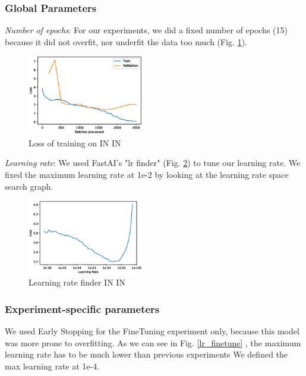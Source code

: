 \documentclass{article}
\begin{document}
\subsubsection{Global Parameters}

\textit{Number of epochs}: For our experiments, we did a fixed number of epochs
 (15) because it did not overfit, nor underfit the data too much (Fig. \ref{loss_in}).

 \begin{figure}[h!]
  \includegraphics[width = 0.45\textwidth]{imgs/sin/loss}
  \caption{Loss of training on IN \texorpdfstring{\textrightarrow} .IN}
  \label{loss_in}
\end{figure}

\textit{Learning rate}: We used FastAI's "lr finder" (Fig. \ref{lr_finder}) to tune our learning rate.
We fixed the maximum learning rate at 1e-2 by looking at the learning rate space search graph.
\begin{figure}[h!]
  \includegraphics[width = 0.45\textwidth]{imgs/lr_find.eps}
  \caption{Learning rate finder IN \texorpdfstring{\textrightarrow} .IN}
  \label{lr_finder}
\end{figure}

\subsubsection{Experiment-specific parameters}
We used Early Stopping for the FineTuning experiment only, because this model was more prone to overfitting.
As we can see in Fig. \ref{lr_finetune} , the maximum learning rate has to be much lower than previous experiments 
We defined the max learning rate at 1e-4.
\end{document}
